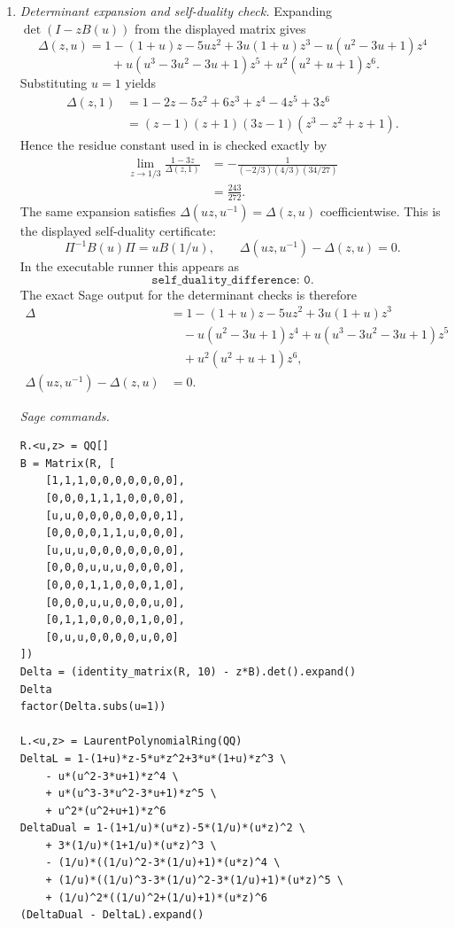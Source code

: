 \begin{enumerate}[label=(\alph*)]
  \item \textit{Determinant expansion and self-duality check.}\quad
    Expanding \(\det(I-zB(u))\) from the displayed matrix gives
    \[
      \Delta(z,u)
      =1-(1+u)z-5uz^2+3u(1+u)z^3-u(u^2-3u+1)z^4
    \]
    \[
      \qquad
      +u(u^3-3u^2-3u+1)z^5+u^2(u^2+u+1)z^6.
    \]
    Substituting \(u=1\) yields
    \[
    \begin{aligned}
      \Delta(z,1)
      &=1-2z-5z^2+6z^3+z^4-4z^5+3z^6\\
      &=(z-1)(z+1)(3z-1)(z^3-z^2+z+1).
    \end{aligned}
    \]
    Hence the residue constant used in
     is checked exactly by
    \[
      \begin{aligned}
      \lim_{z\to1/3}\frac{1-3z}{\Delta(z,1)}
      &=-\frac{1}{(-2/3)(4/3)(34/27)}\\
      &=\frac{243}{272}.
      \end{aligned}
    \]
    The same expansion satisfies
    \(\Delta(uz,u^{-1})=\Delta(z,u)\) coefficientwise.  This is the
    displayed self-duality certificate:
    \[
      \Pi^{-1}B(u)\Pi=uB(1/u),
      \qquad
      \Delta(uz,u^{-1})-\Delta(z,u)=0.
    \]
    In the executable runner this appears as
    \[
      \texttt{self\_duality\_difference: 0}.
    \]
    The exact Sage output for the determinant checks is therefore
    \[
    \begin{aligned}
      \Delta
      &=1-(1+u)z-5uz^2+3u(1+u)z^3\\
      &\quad -u(u^2-3u+1)z^4
        +u(u^3-3u^2-3u+1)z^5\\
      &\quad +u^2(u^2+u+1)z^6,\\
      \Delta(uz,u^{-1})-\Delta(z,u)&=0.
    \end{aligned}
    \]

    \medskip
    \noindent\textit{Sage commands.}
\begin{verbatim}
R.<u,z> = QQ[]
B = Matrix(R, [
    [1,1,1,0,0,0,0,0,0,0],
    [0,0,0,1,1,1,0,0,0,0],
    [u,u,0,0,0,0,0,0,0,1],
    [0,0,0,0,1,1,u,0,0,0],
    [u,u,u,0,0,0,0,0,0,0],
    [0,0,0,u,u,u,0,0,0,0],
    [0,0,0,1,1,0,0,0,1,0],
    [0,0,0,u,u,0,0,0,u,0],
    [0,1,1,0,0,0,0,1,0,0],
    [0,u,u,0,0,0,0,u,0,0]
])
Delta = (identity_matrix(R, 10) - z*B).det().expand()
Delta
factor(Delta.subs(u=1))

L.<u,z> = LaurentPolynomialRing(QQ)
DeltaL = 1-(1+u)*z-5*u*z^2+3*u*(1+u)*z^3 \
    - u*(u^2-3*u+1)*z^4 \
    + u*(u^3-3*u^2-3*u+1)*z^5 \
    + u^2*(u^2+u+1)*z^6
DeltaDual = 1-(1+1/u)*(u*z)-5*(1/u)*(u*z)^2 \
    + 3*(1/u)*(1+1/u)*(u*z)^3 \
    - (1/u)*((1/u)^2-3*(1/u)+1)*(u*z)^4 \
    + (1/u)*((1/u)^3-3*(1/u)^2-3*(1/u)+1)*(u*z)^5 \
    + (1/u)^2*((1/u)^2+(1/u)+1)*(u*z)^6
(DeltaDual - DeltaL).expand()
\end{verbatim}


\end{enumerate}
